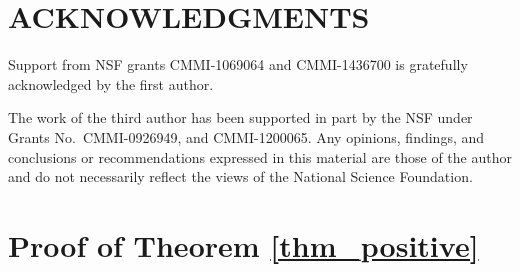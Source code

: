 \documentclass[final,11pt,3p]{article}\usepackage{setspace}
\begin{document}
\section*{ACKNOWLEDGMENTS}
Support from NSF grants CMMI-1069064 and CMMI-1436700 is gratefully acknowledged by the first author.

The work of the third author has been supported in part by the NSF under Grants No.~CMMI-0926949, and CMMI-1200065. Any opinions, findings, and conclusions or recommendations
expressed in this material are those of the author and do not necessarily
reflect the views of the National Science Foundation.

 

\appendix
\section{Proof of Theorem \ref{thm_positive} } \label{appendix: thm_positive}
\end{document}

